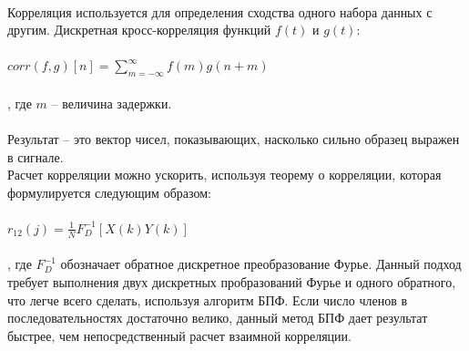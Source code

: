 \documentclass[a4paper,12pt]{article}
\begin{document}
{}
\\Корреляция используется для определения сходства одного набора данных с другим.
Дискретная кросс-корреляция функций $f(t)$ и $g(t)$:\\\\
$corr(f,g)[n] = {\sum_{m=-{\infty}}^{\infty}}f(m)g(n+m)$\\\\
, где $m$ -- величина задержки. \\\\
Результат -- это вектор чисел, показывающих, насколько сильно образец выражен в сигнале.\\
Расчет корреляции можно ускорить, используя теорему о корреляции, которая формулируется следующим образом:\\\\
$r_{12}(j)={\frac{1}{N}}F_D^{-1}[X(k)Y(k)]$\\\\
, где $F_D^{-1}$ обозначает обратное дискретное преобразование Фурье. Данный подход требует выполнения двух дискретных пробразований Фурье и одного обратного, что легче всего сделать, используя алгоритм БПФ. Если число членов в последовательностях достаточно велико, данный метод БПФ дает результат быстрее, чем непосредственный расчет взаимной корреляции. 
\newpage
\end{document}
